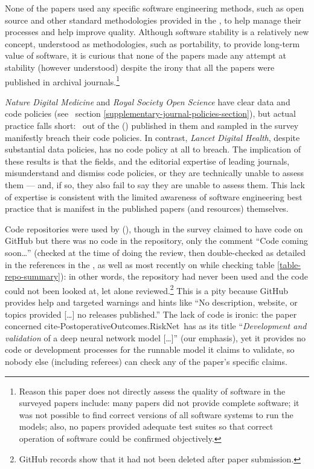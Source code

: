 None of the papers used any specific software engineering methods, such as open source \cite{open-source} and other standard methodologies provided in the \supplement, to help manage their processes and help improve quality. Although software stability \cite{stability} is a relatively new concept, understood as methodologies, such as portability, to provide long-term value of software, it is curious that none of the papers made any attempt at stability (however understood) despite the irony that all the papers were published in archival journals.\footnote{Reason this paper does not directly assess the quality of software in the surveyed papers include: many papers did not provide complete software; it was not possible to find correct versions of all software systems to run the models; also, no papers provided adequate test suites so that correct operation of software could be confirmed objectively.}

\emph{Nature Digital Medicine\/} and \emph{Royal Society Open Science\/} have clear data and code policies (see \supplement\ section \ref{supplementary-journal-policies-section}), but actual practice falls short: \the\countHasBreach\ out of the  (\pc{\countHasBreach}{\countHasPolicy}) published in them and sampled in the survey manifestly breach their code policies. In contrast, \emph{Lancet Digital Health\/}, despite substantial data policies, has no code policy at all to breach. The implication of these results is that the fields, and the editorial expertise of leading journals, misunderstand and dismiss code policies, or they are technically unable to assess them --- and, if so, they also fail to say they are unable to assess them. This lack of expertise is consistent with the limited awareness of software engineering best practice that is manifest in the published papers (and resources) themselves.

Code repositories were used by  (\pc{\countUsesVersionControlRepository}{\dataN}), though  in the survey claimed to have code on GitHub but there was no code in the repository, only the comment ``Code coming soon\ldots'' (checked at the time of doing the review, then double-checked as detailed in the references in the \supplement, as well as most recently on 
while checking table \ref{table-repo-summary}): in other words, the repository had never been used and the code could not been looked at, let alone reviewed.\footnote{GitHub records show that it had not been deleted after paper submission.} This is a pity because GitHub provides help and targeted warnings and hints like ``No description, website, or topics provided [\ldots] no releases published.'' The lack of code is ironic: the paper concerned \csname cite-PostoperativeOutcomes.RiskNet\endcsname\ has as its title ``\emph{Development and validation\/} of a deep neural network model [\ldots]'' (our emphasis), yet it provides no code or development processes for the runnable model it claims to validate, so nobody else (including referees) can check any of the paper's specific claims.

